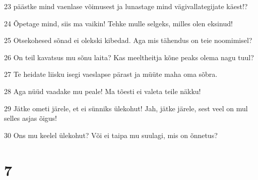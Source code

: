 \par 23 päästke mind vaenlase võimusest ja lunastage mind vägivallategijate käest!?
\par 24 Õpetage mind, siis ma vaikin! Tehke mulle selgeks, milles olen eksinud!
\par 25 Otsekohesed sõnad ei olekski kibedad. Aga mis tähendus on teie noomimisel?
\par 26 On teil kavatsus mu sõnu laita? Kas meeltheitja kõne peaks olema nagu tuul?
\par 27 Te heidate liisku isegi vaeslapse pärast ja müüte maha oma sõbra.
\par 28 Aga nüüd vaadake mu peale! Ma tõesti ei valeta teile näkku!
\par 29 Jätke ometi järele, et ei sünniks ülekohut! Jah, jätke järele, sest veel on mul selles asjas õigus!
\par 30 Ons mu keelel ülekohut? Või ei taipa mu suulagi, mis on õnnetus?

\chapter{7}

